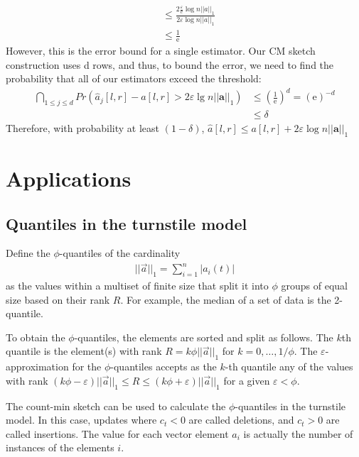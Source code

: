 \documentclass[11pt]{article}
\begin{document}
{\begin{align*}
    &\leq \frac{2\frac{\varepsilon}{\mathrm e}\log n ||a||_1}{2\varepsilon \log n ||a||_1}\\
    &\leq \frac{1}{\mathrm e}
\end{align*}
However, this is the error bound for a single estimator. Our CM sketch construction uses d rows, and thus, to bound the error, we need to find the probability that all of our estimators exceed the threshold:
\begin{align*}
    \bigcap_{1\leq j \leq d} Pr(\hat a_j[l,r] - a[l,r] > 2\varepsilon \lg n ||\bm{a}||_1) &\leq \left(\frac{1}{\mathrm e}\right)^d = (\mathrm e)^{-d}\\
    &\leq \delta
\end{align*}
Therefore, with probability at least $(1-\delta)$, $\hat a[l,r] \leq a[l,r] + 2\varepsilon \log n ||\bm{a}||_1$
\section{Applications}
\subsection{Quantiles in the turnstile model}
Define the $\phi$-quantiles of the cardinality
\begin{align}
    ||\vec{a}||_1 = \sum_{i = 1}^{n}|a_i(t)|
\end{align}
as the values within a multiset of finite size that split it into $\phi$ groups
of equal size based on their rank $R$.  For example, the median of a set of data
is the 2-quantile. 

To obtain the $\phi$-quantiles, the elements are sorted and split as follows.
The $k$th quantile is the element(s) with rank $R = k\phi||\vec{a}||_1$ for $k =
0, \dots, 1/\phi$.  The $\varepsilon$-approximation for the $\phi$-quantiles
accepts as the $k$-th quantile any of the  values with rank $(k\phi -
\varepsilon)||\vec{a}||_1 \leq R \leq (k\phi + \varepsilon)||\vec{a}||_1$ for a
given $\varepsilon < \phi$.


The count-min sketch can be used to calculate the $\phi$-quantiles in the turnstile model.
In this case, updates where $c_t < 0$ are called deletions, and $c_t > 0$ are called insertions.
The value for each vector element $a_i$ is actually the number of instances of the elements
$i$.

}
\end{document}
